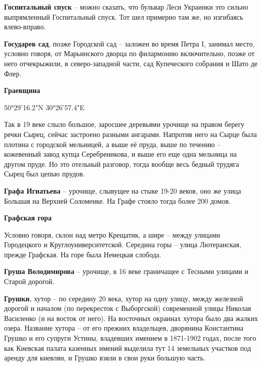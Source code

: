 \medskip

\textbf{Госпитальный спуск} – можно сказать, что бульвар Леси Украинки это сильно выпрямленный Госпитальный спуск. Тот шел примерно там же, но изгибаясь влево-вправо.\\

\medskip

\textbf{Государев сад}, позже Городской сад – заложен во время Петра I, занимал место, условно говоря, от Марьинского дворца по филармонию включительно, позже от него отчекрыжили, в северо-западной части, сад Купеческого собрания и Шато де Флер.

\medskip

\textbf{Граевщина} 

50°29'16.2"N 30°26'57.4"E

Так в 19 веке слыло большое, заросшее деревьями урочище на правом берегу речки Сырец, сейчас застроено разными ангарами. Напротив него на Сырце была плотина с городской мельницей, а выше её пруда, выше по течению – кожевенный завод купца Серебреникова, и выше его еще одна мельница на другом пруде. Но это отельный разговор, тогда вообще весь бедный трудяга Сырец был цепью прудов.\\

\medskip

\textbf{Графа Игнатьева} – урочище, слывущее на стыке 19-20 веков, оно же улица Большая на Верхней Соломенке. На Графе стояло тогда более 200 домов.\\

\medskip

\textbf{Графская гора} 

Условно говоря, склон над метро Крещатик, а шире – между улицами Городецкого и Круглоуниверситетской. Середина горы – улица Лютеранская, прежде Графская. На горе была Немецкая слобода.\\

\medskip

\textbf{Груша Володимирова} – урочище, в 16 веке граничащее с Тесными улицами и Старой дорогой.\\

\medskip

\textbf{Грушки}, хутор – по середину 20 века, хутор на одну улицу, между железной дорогой и началом (по перекресток с Выборгской) современной улицы Николая Василенко (и на восток от него). На восточных окраинах хутора было два жалких озера. Название хутора – от его прежних владельцев, дворянина Константина Грушко и его супруги Устины, владевших имением в 1871-1902 годах, после того как Киевская палата казенных имений выделила тут 14 земельных участков под аренду для киевлян, и Грушко взяли в свои руки большую часть. 

